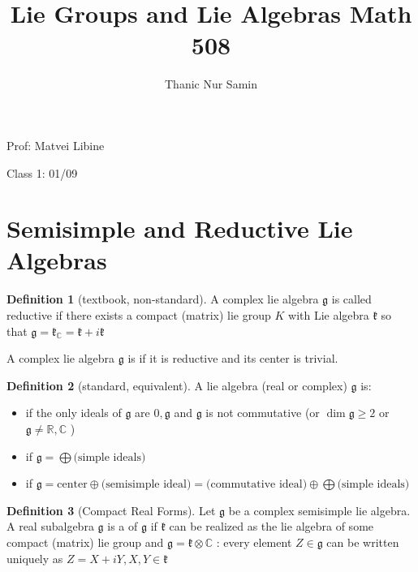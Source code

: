 \documentclass{article}
\title{Lie Groups and Lie Algebras Math 508}
\author{Thanic Nur Samin}
\date{\vspace{-5ex}}
\theoremstyle{definition}
\newtheorem{definition}{Definition}
\begin{document}
\maketitle

Prof: Matvei Libine

Class 1: 01/09

\section*{Semisimple and Reductive Lie Algebras}

\begin{definition}[textbook, non-standard]
    A complex lie algebra \(\mathfrak{g} \) is called reductive if there exists a compact (matrix) lie group \(K\) with Lie algebra \(\mathfrak{k} \) so that \(\mathfrak{g} =\mathfrak{k} _\mathbb{C} =\mathfrak{k} +i\mathfrak{k} \)

    A complex lie algebra \(\mathfrak{g} \) is  if it is reductive and its center is trivial.
\end{definition}

\begin{definition}[standard, equivalent]
    A lie algebra (real or complex) \(\mathfrak{g} \) is:
    \begin{itemize}
        \item {} if the only ideals of \(\mathfrak{g} \) are \(0,\mathfrak{g} \) and \(\mathfrak{g} \) is not commutative (or \(\dim\mathfrak{g} \geq 2\) or \(\mathfrak{g} \neq \mathbb{R} ,\mathbb{C} \) )
        \item {} if \(\mathfrak{g} =\bigoplus \text{(simple ideals)} \) 
        \item {} if \(\mathfrak{g}=\text{center} \oplus \text{(semisimple ideal)} =\text{(commutative ideal)} \oplus \bigoplus \text{(simple ideals)} \) 
    \end{itemize}
\end{definition}

\begin{definition}[Compact Real Forms]
    Let \(\mathfrak{g}\) be a complex semisimple lie algebra. A real subalgebra \(\mathfrak{g} \) is a  of \(\mathfrak{g} \) if \(\mathfrak{k} \) can be realized as the lie algebra of some compact (matrix) lie group and \(\mathfrak{g} =\mathfrak{k} \otimes \mathbb{C} \) : every element \(Z\in \mathfrak{g} \) can be written uniquely as  \(Z=X+iY, X,Y\in \mathfrak{k} \) 
\end{definition}
\end{document}
